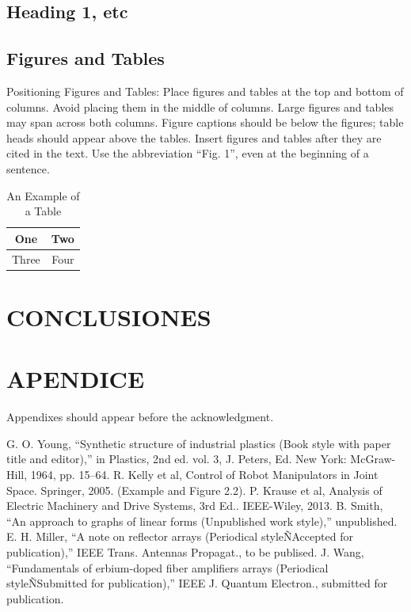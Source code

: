\documentclass[a4paper, 10pt, onecolumn,journal]{ieeeconf}
\begin{document}
\subsection{Heading 1, etc}


\subsection{Figures and Tables}

Positioning Figures and Tables: Place figures and tables at the top and bottom of columns. Avoid placing them in the middle of columns. Large figures and tables may span across both columns. Figure captions should be below the figures; table heads should appear above the tables. Insert figures and tables after they are cited in the text. Use the abbreviation ``Fig. 1'', even at the beginning of a sentence.

\begin{table}[h]
\caption{An Example of a Table}
\label{table_example}
\begin{center}
\begin{tabular}{|c||c|}
\hline
One & Two\\
\hline
Three & Four\\
\hline
\end{tabular}
\end{center}
\end{table}

\section{CONCLUSIONES}

\section*{APENDICE}

Appendixes should appear before the acknowledgment.

\begin{thebibliography}{99}

 G. O. Young, ``Synthetic structure of industrial plastics (Book style with paper title and editor),'' 	in Plastics, 2nd ed. vol. 3, J. Peters, Ed.  New York: McGraw-Hill, 1964, pp. 15--64.
 R. Kelly et al, Control of Robot Manipulators in Joint Space. Springer, 2005. (Example and Figure 2.2).
 P. Krause et al, Analysis of Electric Machinery and Drive Systems, 3rd Ed.. IEEE-Wiley, 2013.
 B. Smith, ``An approach to graphs of linear forms (Unpublished work style),'' unpublished.
 E. H. Miller, ``A note on reflector arrays (Periodical styleÑAccepted for publication),'' IEEE Trans. Antennas Propagat., to be publised.
 J. Wang, ``Fundamentals of erbium-doped fiber amplifiers arrays (Periodical styleÑSubmitted for publication),'' IEEE J. Quantum Electron., submitted for publication.

\end{thebibliography}
\end{document}
